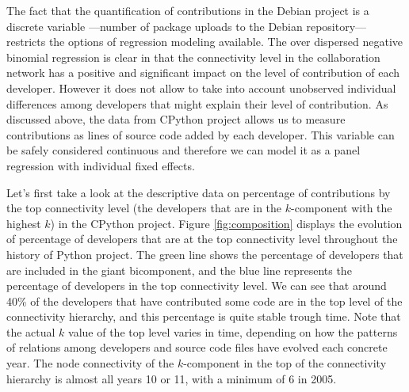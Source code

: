 

The fact that the quantification of contributions in the Debian project is a discrete variable ---number of package uploads to the Debian repository--- restricts the options of regression modeling available. The over dispersed negative binomial regression is clear in that the connectivity level in the collaboration network has a positive and significant impact on the level of contribution of each developer. However it does not allow to take into account unobserved individual differences among developers that might explain their level of contribution. As discussed above, the data from CPython project allows us to measure contributions as lines of source code added by each developer. This variable can be safely considered continuous and therefore we can model it as a panel regression with individual fixed effects.

Let's first take a look at the descriptive data on percentage of contributions by the top connectivity level (the developers that are in the $k$-component with the highest $k$) in the CPython project. Figure \ref{fig:composition} displays the evolution of percentage of developers that are at the top connectivity level throughout the history of Python project. The green line shows the percentage of developers that are included in the giant bicomponent, and the blue line represents the percentage of developers in the top connectivity level. We can see that around 40\% of the developers that have contributed some code are in the top level of the connectivity hierarchy, and this percentage is quite stable trough time. Note that the actual $k$ value of the top level varies in time, depending on how the patterns of relations among developers and source code files have evolved each concrete year. The node connectivity of the $k$-component in the top of the connectivity hierarchy is almost all years 10 or 11, with a minimum of 6 in 2005.

